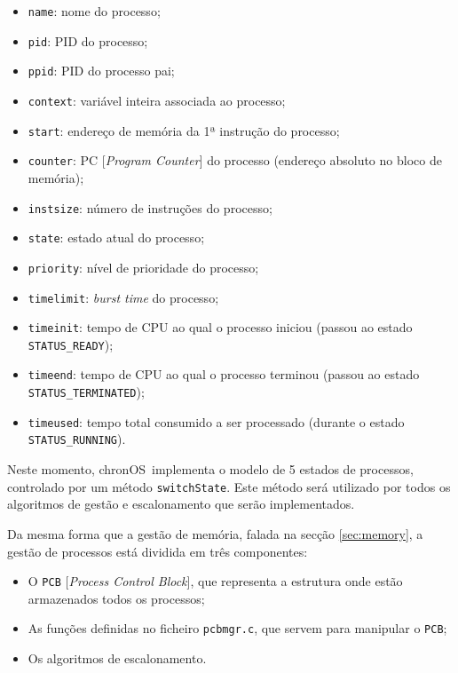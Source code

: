 \documentclass[a4paper,11pt,onecolumn,oneside]{article}
\newcommand{\chronOS}{\textsf{chronOS}}
\begin{document}
	\begin{itemize}
		\item \verb|name|: nome do processo;
		\item \verb|pid|: PID do processo;
		\item \verb|ppid|: PID do processo pai;
		\item \verb|context|: variável inteira associada ao processo;
		\item \verb|start|: endereço de memória da 1ª instrução do processo;
		\item \verb|counter|: PC [\textit{Program Counter}] do processo (endereço absoluto no bloco de memória);
		\item \verb|instsize|: número de instruções do processo;
		\item \verb|state|: estado atual do processo;
		\item \verb|priority|: nível de prioridade do processo;
		\item \verb|timelimit|: \textit{burst time} do processo;
		\item \verb|timeinit|: tempo de CPU ao qual o processo iniciou (passou ao estado \texttt{STATUS\_READY});
		\item \verb|timeend|: tempo de CPU ao qual o processo terminou (passou ao estado \texttt{STATUS\_TERMINATED});
		\item \verb|timeused|: tempo total consumido a ser processado (durante o estado \texttt{STATUS\_RUNNING}).
	\end{itemize}
	
	Neste momento, \chronOS~implementa o modelo de 5 estados de processos, controlado por um método \verb|switchState|. Este método será utilizado por todos os algoritmos de gestão e escalonamento que serão implementados.
	
	Da mesma forma que a gestão de memória, falada na secção \ref{sec:memory}, a gestão de processos está dividida em três componentes:
	
	\begin{itemize} %
	    \item O \verb|PCB| [\textit{Process Control Block}], que representa a estrutura onde estão armazenados todos os processos;
	    \item As funções definidas no ficheiro \verb|pcbmgr.c|, que servem para manipular o \verb|PCB|;
	    \item Os algoritmos de escalonamento.
	\end{itemize}
	
\end{document}
